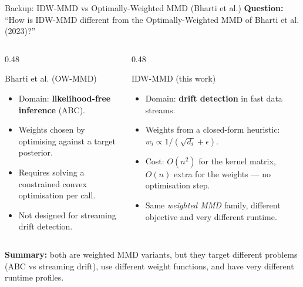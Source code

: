 \documentclass[aspectratio=169,10pt]{beamer}
\begin{document}
\begin{frame}{Backup: IDW-MMD vs Optimally-Weighted MMD (Bharti et al.)}
	\textbf{Question:} ``How is IDW-MMD different from the Optimally-Weighted MMD of Bharti et al. (2023)?''

	\vspace{0.5em}
	\begin{columns}[T]
		\begin{column}{0.48\textwidth}
			\begin{block}{Bharti et al. (OW-MMD)}
				\begin{itemize}
					\item Domain: \textbf{likelihood-free inference} (ABC).
					\item Weights chosen by optimising against a target posterior.
					\item Requires solving a constrained convex optimisation per call.
					\item Not designed for streaming drift detection.
				\end{itemize}
			\end{block}
		\end{column}
		\begin{column}{0.48\textwidth}
			\begin{exampleblock}{IDW-MMD (this work)}
				\begin{itemize}
					\item Domain: \textbf{drift detection} in fast data streams.
					\item Weights from a closed-form heuristic: $w_i \propto 1/(\sqrt{d_i} + \epsilon)$.
					\item Cost: $O(n^2)$ for the kernel matrix, $O(n)$ extra for the weights --- no optimisation step.
					\item Same \textit{weighted MMD} family, different objective and very different runtime.
				\end{itemize}
			\end{exampleblock}
		\end{column}
	\end{columns}

	\vspace{0.5em}
	\textbf{Summary:} both are weighted MMD variants, but they target different problems (ABC vs streaming drift), use different weight functions, and have very different runtime profiles.
\end{frame}
\end{document}

